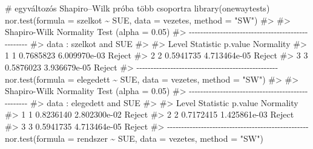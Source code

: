 \documentclass[
  letterpaper,
]{krantz}
\makeatletter
\newenvironment{Shaded}{\begin{snugshade}}{\end{snugshade}}
\newcommand{\AttributeTok}[1]{\textcolor[rgb]{0.40,0.45,0.13}{#1}}
\newcommand{\CommentTok}[1]{\textcolor[rgb]{0.37,0.37,0.37}{#1}}
\newcommand{\FunctionTok}[1]{\textcolor[rgb]{0.28,0.35,0.67}{#1}}
\newcommand{\NormalTok}[1]{\textcolor[rgb]{0.00,0.23,0.31}{#1}}
\newcommand{\SpecialCharTok}[1]{\textcolor[rgb]{0.37,0.37,0.37}{#1}}
\newcommand{\StringTok}[1]{\textcolor[rgb]{0.13,0.47,0.30}{#1}}
\newenvironment{kframe}{%
\medskip{}
\setlength{\fboxsep}{.8em}
 \def\at@end@of@kframe{}%
 \ifinner\ifhmode%
  \def\at@end@of@kframe{\end{minipage}}%
  \begin{minipage}{\columnwidth}%
 \fi\fi%
 \def\FrameCommand##1{\hskip\@totalleftmargin \hskip-\fboxsep
 \colorbox{shadecolor}{##1}\hskip-\fboxsep
     \hskip-\linewidth \hskip-\@totalleftmargin \hskip\columnwidth}%
 \MakeFramed {\advance\hsize-\width
   \@totalleftmargin\z@ \linewidth\hsize
   \@setminipage}}%
 {\par\unskip\endMakeFramed%
 \at@end@of@kframe}
\renewenvironment{Shaded}{\begin{kframe}}{\end{kframe}}
\makeatother
\begin{document}
\begin{Shaded}
\begin{Highlighting}[]
\CommentTok{\# egyváltozós Shapiro–Wilk próba több csoportra}
\FunctionTok{library}\NormalTok{(onewaytests)}
\FunctionTok{nor.test}\NormalTok{(}\AttributeTok{formula =}\NormalTok{ szelkot }\SpecialCharTok{\textasciitilde{}}\NormalTok{ SUE, }\AttributeTok{data =}\NormalTok{ vezetes, }\AttributeTok{method =} \StringTok{"SW"}\NormalTok{)}
\CommentTok{\#\textgreater{} }
\CommentTok{\#\textgreater{}   Shapiro{-}Wilk Normality Test (alpha = 0.05) }
\CommentTok{\#\textgreater{} {-}{-}{-}{-}{-}{-}{-}{-}{-}{-}{-}{-}{-}{-}{-}{-}{-}{-}{-}{-}{-}{-}{-}{-}{-}{-}{-}{-}{-}{-}{-}{-}{-}{-}{-}{-}{-}{-}{-}{-}{-}{-}{-}{-}{-}{-}{-}{-}{-}{-} }
\CommentTok{\#\textgreater{}   data : szelkot and SUE }
\CommentTok{\#\textgreater{} }
\CommentTok{\#\textgreater{}   Level Statistic      p.value   Normality}
\CommentTok{\#\textgreater{} 1     1 0.7685823 6.009970e{-}03      Reject}
\CommentTok{\#\textgreater{} 2     2 0.5941735 4.713464e{-}05      Reject}
\CommentTok{\#\textgreater{} 3     3 0.5876023 3.936679e{-}05      Reject}
\CommentTok{\#\textgreater{} {-}{-}{-}{-}{-}{-}{-}{-}{-}{-}{-}{-}{-}{-}{-}{-}{-}{-}{-}{-}{-}{-}{-}{-}{-}{-}{-}{-}{-}{-}{-}{-}{-}{-}{-}{-}{-}{-}{-}{-}{-}{-}{-}{-}{-}{-}{-}{-}{-}{-}}
\FunctionTok{nor.test}\NormalTok{(}\AttributeTok{formula =}\NormalTok{ elegedett }\SpecialCharTok{\textasciitilde{}}\NormalTok{ SUE, }\AttributeTok{data =}\NormalTok{ vezetes, }\AttributeTok{method =} \StringTok{"SW"}\NormalTok{)}
\CommentTok{\#\textgreater{} }
\CommentTok{\#\textgreater{}   Shapiro{-}Wilk Normality Test (alpha = 0.05) }
\CommentTok{\#\textgreater{} {-}{-}{-}{-}{-}{-}{-}{-}{-}{-}{-}{-}{-}{-}{-}{-}{-}{-}{-}{-}{-}{-}{-}{-}{-}{-}{-}{-}{-}{-}{-}{-}{-}{-}{-}{-}{-}{-}{-}{-}{-}{-}{-}{-}{-}{-}{-}{-}{-}{-} }
\CommentTok{\#\textgreater{}   data : elegedett and SUE }
\CommentTok{\#\textgreater{} }
\CommentTok{\#\textgreater{}   Level Statistic      p.value   Normality}
\CommentTok{\#\textgreater{} 1     1 0.8236140 2.802300e{-}02      Reject}
\CommentTok{\#\textgreater{} 2     2 0.7172415 1.425861e{-}03      Reject}
\CommentTok{\#\textgreater{} 3     3 0.5941735 4.713464e{-}05      Reject}
\CommentTok{\#\textgreater{} {-}{-}{-}{-}{-}{-}{-}{-}{-}{-}{-}{-}{-}{-}{-}{-}{-}{-}{-}{-}{-}{-}{-}{-}{-}{-}{-}{-}{-}{-}{-}{-}{-}{-}{-}{-}{-}{-}{-}{-}{-}{-}{-}{-}{-}{-}{-}{-}{-}{-}}
\FunctionTok{nor.test}\NormalTok{(}\AttributeTok{formula =}\NormalTok{ rendszer }\SpecialCharTok{\textasciitilde{}}\NormalTok{ SUE, }\AttributeTok{data =}\NormalTok{ vezetes, }\AttributeTok{method =} \StringTok{"SW"}\NormalTok{)}

\end{Highlighting}
\end{Shaded}
\end{document}

